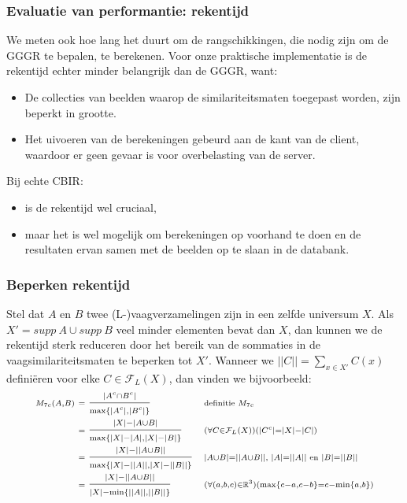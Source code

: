 \documentclass[dutch]{beamer}
\theoremstyle{definition}
\theoremstyle{remark}
\theoremstyle{example}
\begin{document}
\frame
{
  \frametitle{Evaluatie van performantie: rekentijd}
  
  We meten ook hoe lang het duurt om de rangschikkingen, die nodig zijn om 
  de GGGR te bepalen, te berekenen. Voor onze praktische implementatie
  is de rekentijd echter minder belangrijk dan de GGGR, want:
  \begin{itemize}
    \item De collecties van beelden waarop de similariteitsmaten toegepast worden,
    zijn beperkt in grootte.
    \item Het uivoeren van de berekeningen gebeurd aan de kant van de client, 
    waardoor er geen gevaar is voor overbelasting van de server.
  \end{itemize}
  Bij echte CBIR:
  \begin{itemize}
    \item is de rekentijd wel cruciaal,
    \item maar het is wel mogelijk om berekeningen op voorhand te doen en de resultaten
    ervan samen met de beelden op te slaan in de databank.
  \end{itemize}
}
\frame
{
  \frametitle{Beperken rekentijd}
  
  Stel dat $A$ en $B$ twee (L-)vaagverzamelingen zijn in een zelfde universum $X$. 
  Als $X'= supp\ A \cup supp\ B$ veel minder elementen bevat dan $X$, dan kunnen we 
  de rekentijd sterk reduceren door het bereik van de sommaties in de 
  vaagsimilariteitsmaten te beperken tot $X'$. Wanneer we $||C|| = \sum_{x \in X'} C(x)$
  defini\"eren voor elke $C \in \mathcal{F}_L(X)$, dan vinden we bijvoorbeeld:
  \begin{align*}
  \scriptstyle M_{7c}(A,B) 
  & \scriptstyle\ = \displaystyle \frac{\scriptstyle |A^c \cap B^c|}{\scriptstyle \max \{|A^c|,|B^c|\}} & & {\scriptsize \scriptstyle \text{definitie } M_{7c}} \\
  & \scriptstyle\ = \displaystyle \frac{\scriptstyle |X|-|A \cup B|}{\scriptstyle \max \{|X|-|A|,|X|-|B|\}} & & {\scriptsize \scriptstyle (\forall C \in \mathcal{F}_L(X))(|C^c|=|X|-|C|)} \\ 
  & \scriptstyle\ = \displaystyle \frac{\scriptstyle |X|-||A \cup B||}{\scriptstyle \max \{|X|-||A||,|X|-||B||\}} & & {\scriptsize \scriptstyle |A \cup B|=||A \cup B|| \text{, } |A|=||A|| \text{ en } |B|=||B||} \\
  & \scriptstyle\ = \displaystyle \frac{\scriptstyle |X|-||A \cup B||}{\scriptstyle |X| - \min \{||A||,||B||\}} & & {\scriptsize \scriptstyle (\forall (a,b,c) \in \mathbb{R}^3)(\max\{c-a,c-b\}=c-\min\{a,b\})}
  \end{align*}
}
\end{document}

